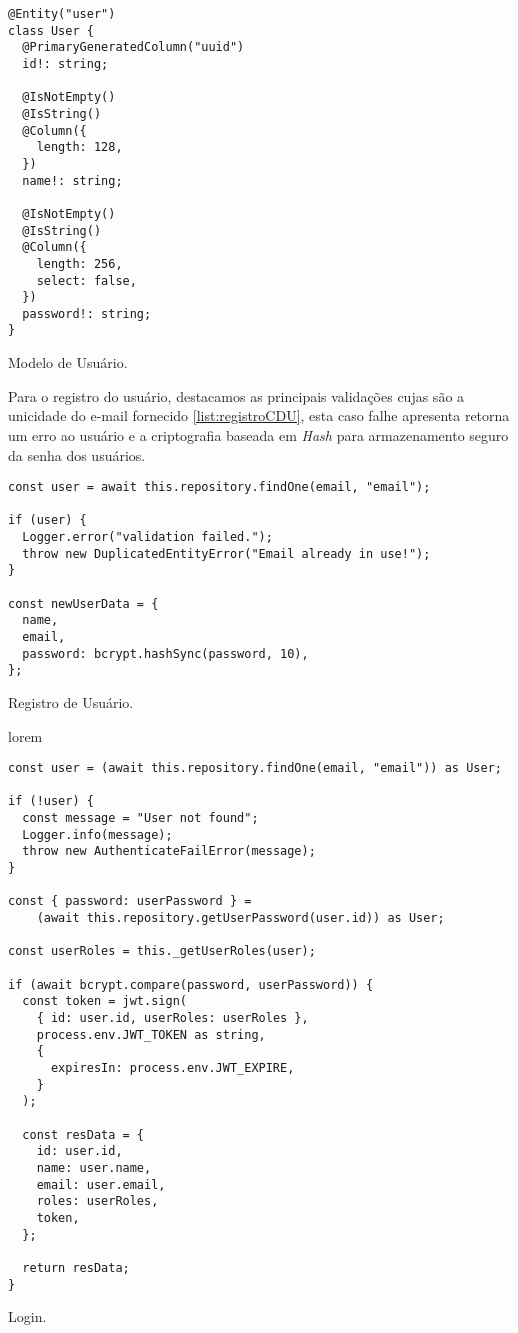 \begin{listing}[h]
    \begin{verbatim}
@Entity("user")
class User {
  @PrimaryGeneratedColumn("uuid")
  id!: string;

  @IsNotEmpty()
  @IsString()
  @Column({
    length: 128,
  })
  name!: string;
  
  @IsNotEmpty()
  @IsString()
  @Column({
    length: 256,
    select: false,
  })
  password!: string;
}
    \end{verbatim}
    \caption {Modelo de Usuário.}
    \label{list:UserModel}
\end{listing}

Para o registro do usuário, destacamos as principais validações cujas são a unicidade do e-mail fornecido \ref{list:registroCDU}, esta caso falhe apresenta retorna um erro ao usuário e a criptografia baseada em \textit{Hash} para armazenamento seguro da senha dos usuários.

\newpage

\begin{listing}[h]
    \begin{verbatim}
const user = await this.repository.findOne(email, "email");

if (user) {
  Logger.error("validation failed.");
  throw new DuplicatedEntityError("Email already in use!");
}

const newUserData = {
  name,
  email,
  password: bcrypt.hashSync(password, 10),
};
    \end{verbatim}
    \caption{Registro de Usuário.}
    \label{list:registroCDU}
\end{listing}


lorem

\begin{listing}[h]
    \begin{verbatim}
const user = (await this.repository.findOne(email, "email")) as User;

if (!user) {
  const message = "User not found";
  Logger.info(message);
  throw new AuthenticateFailError(message);
}

const { password: userPassword } = 
    (await this.repository.getUserPassword(user.id)) as User;

const userRoles = this._getUserRoles(user);

if (await bcrypt.compare(password, userPassword)) {
  const token = jwt.sign(
    { id: user.id, userRoles: userRoles },
    process.env.JWT_TOKEN as string,
    {
      expiresIn: process.env.JWT_EXPIRE,
    }
  );

  const resData = {
    id: user.id,
    name: user.name,
    email: user.email,
    roles: userRoles,
    token,
  };

  return resData;
}
    \end{verbatim}
    \caption{Login.}
    \label{list:login}
\end{listing}


